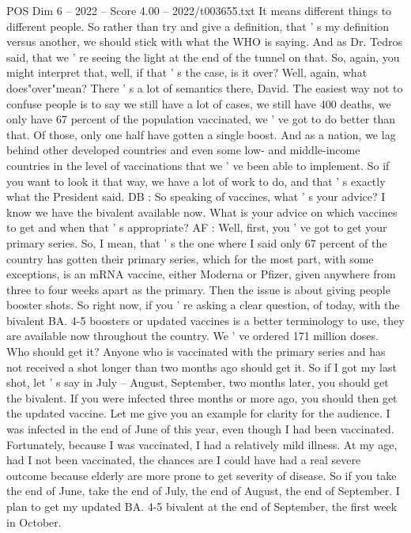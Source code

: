 \begin{textsample}{POS Dim 6 – 2022 – Score 4.00 – 2022/t003655.txt}
It means different things to different people.
So rather than try and give a definition, that ' s my definition versus another, we should stick with what the WHO is saying.
And as Dr.
Tedros said, that we ' re seeing the light at the end of the tunnel on that.
So, again, you might interpret that, well, if that ' s the case, is it over?
Well, again, what does"over"mean?
There ' s a lot of semantics there, David.
The easiest way not to confuse people is to say we still have a lot of cases, we still have 400 deaths, we only have 67 percent of the population vaccinated, we ' ve got to do better than that.
Of those, only one half have gotten a single boost.
And as a nation, we lag behind other developed countries and even some low- and middle-income countries in the level of vaccinations that we ' ve been able to implement.
So if you want to look it that way, we have a lot of work to do, and that ' s exactly what the President said.
DB : So speaking of vaccines, what ' s your advice?
I know we have the bivalent available now.
What is your advice on which vaccines to get and when that ' s appropriate?
AF : Well, first, you ' ve got to get your primary series.
So, I mean, that ' s the one where I said only 67 percent of the country has gotten their primary series, which for the most part, with some exceptions, is an mRNA vaccine, either Moderna or Pfizer, given anywhere from three to four weeks apart as the primary.
Then the issue is about giving people booster shots.
So right now, if you ' re asking a clear question, of today, with the bivalent BA. 4-5 boosters or updated vaccines is a better terminology to use, they are available now throughout the country.
We ' ve ordered 171 million doses.
Who should get it?
Anyone who is vaccinated with the primary series and has not received a shot longer than two months ago should get it.
So if I got my last shot, let ' s say in July -- August, September, two months later, you should get the bivalent.
If you were infected three months or more ago, you should then get the updated vaccine.
Let me give you an example for clarity for the audience.
I was infected in the end of June of this year, even though I had been vaccinated.
Fortunately, because I was vaccinated, I had a relatively mild illness.
At my age, had I not been vaccinated, the chances are I could have had a real severe outcome because elderly are more prone to get severity of disease.
So if you take the end of June, take the end of July, the end of August, the end of September.
I plan to get my updated BA. 4-5 bivalent at the end of September, the first week in October.

\end{textsample}
